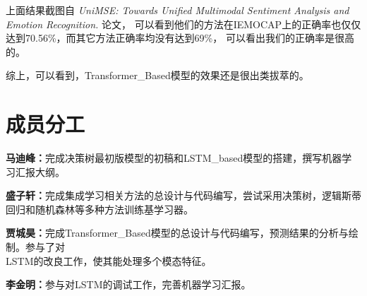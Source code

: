 \documentclass[11pt]{article}
\begin{document}
            上面结果截图自\textit{ UniMSE: Towards Unified Multimodal Sentiment Analysis and Emotion Recognition. }论文，
            可以看到他们的方法在IEMOCAP上的正确率也仅仅达到70.56\%，而其它方法正确率均没有达到69\%，
            可以看出我们的正确率是很高的。
            
            综上，可以看到，Transformer\_Based模型的效果还是很出类拔萃的。

    \section{成员分工}
    \textbf{马迪峰：}完成决策树最初版模型的初稿和LSTM\_based模型的搭建，撰写机器学习汇报大纲。

    \textbf{盛子轩：}完成集成学习相关方法的总设计与代码编写，尝试采用决策树，逻辑斯蒂回归和随机森林等多种方法训练基学习器。

    \textbf{贾城昊：}完成Transformer\_Based模型的总设计与代码编写，预测结果的分析与绘制。参与了对\\LSTM的改良工作，使其能处理多个模态特征。

    \textbf{李金明：}参与对LSTM的调试工作，完善机器学习汇报。
\end{document}
